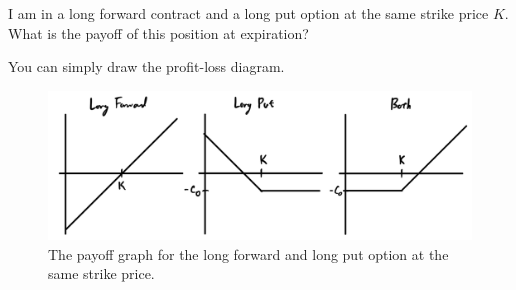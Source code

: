 \documentclass{article}
\begin{document}
      \begin{exercise}[Hull 1.22]
        I am in a long forward contract and a long put option at the same strike price $K$. What is the payoff of this position at expiration?
      \end{exercise}
      \begin{solution}
        You can simply draw the profit-loss diagram. 
        \begin{figure}[H]
          \centering 
          \includegraphics[scale=0.2]{img/ex1-22.png}
          \caption{The payoff graph for the long forward and long put option at the same strike price.} 
          \label{fig:ex1-22}
        \end{figure}
      \end{solution}
\end{document}
